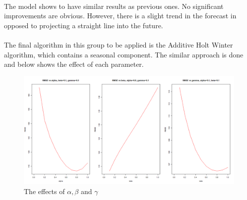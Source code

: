 \documentclass[12pt]{article}
\begin{document}
\paragraph{}
The model shows to have similar results as previous ones. No significant improvements are obvious. However, there is a slight trend in the forecast in opposed to projecting a straight line into the future.

\paragraph{}
The final algorithm in this group to be applied is the Additive Holt Winter algorithm, which contains a seasonal component. The similar approach is done and below shows the effect of each parameter.
\begin{figure}[H]
  \centering
  \includegraphics[width=\linewidth]{figure22.png}
  \caption{The effects of $\alpha, \beta$ and $\gamma$}
  \label{fig:figure23}
\end{figure}
\end{document}
